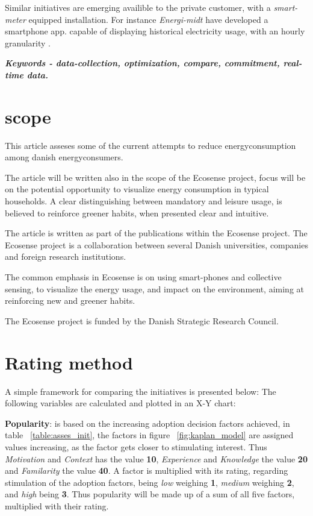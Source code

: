 \documentclass[journal]{IEEEtran}
\begin{document}
Similar initiatives are emerging availible to the private customer, with a \textit{smart-meter} equipped installation. For instance \textit{Energi-midt} have developed a smartphone app. capable of displaying historical electricity usage, with an hourly granularity \cite{em_app}. \newline

\textbf{\textit{Keywords - data-collection, optimization, compare, commitment, real-time data.}}

\section{scope}
This article asseses some of the current attempts to reduce energyconsumption among danish energyconsumers.

The article will be written also in the scope of the Ecosense project, focus will be on the potential opportunity to visualize energy consumption in typical households. A clear distinguishing between mandatory and leisure usage, is believed to reinforce greener habits, when presented clear and intuitive.

The article is written as part of the publications within the Ecosense project. The Ecosense project is a collaboration between several Danish universities, companies and foreign research institutions. 

The common emphasis in Ecosense is on using smart-phones and collective sensing, to visualize the energy usage, and impact on the environment, aiming at reinforcing new and greener habits. 

The Ecosense project is funded by the Danish Strategic Research Council.

\section{Rating method}
A simple framework for comparing the initiatives is presented below:
The following variables are calculated and plotted in an X-Y chart: \newline

\textbf{Popularity}: is based on the increasing adoption decision factors achieved, in table ~\ref{table:asses_init}, the factors in figure ~\ref{fig:kaplan_model} are assigned values increasing, as the factor gets closer to stimulating interest.
Thus \textit{Motivation} and \textit{Context} has the value \textbf{10}, \textit{Experience} and \textit{Knowledge} the value \textbf{20} and \textit{Familarity} the value \textbf{40}. A factor is multiplied with its rating, regarding stimulation of the adoption factors, being \textit{low} weighing \textbf{1}, \textit{medium} weighing \textbf{2}, and \textit{high} being \textbf{3}.
Thus popularity will be made up of a sum of all five factors, multiplied with their rating.\newline
\end{document}
